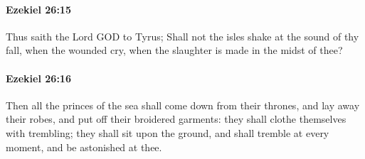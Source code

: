 		\paragraph{Ezekiel 26:15} %
			\label{EZEKIEL-26-15}

			Thus saith the Lord GOD to Tyrus; Shall not the isles shake at the sound of thy fall, when the wounded cry, when the slaughter is made in the midst of thee?


		\paragraph{Ezekiel 26:16} %
			\label{EZEKIEL-26-16}

			Then all the princes of the sea shall come down from their thrones, and lay away their robes, and put off their broidered garments: they shall clothe themselves with trembling; they shall sit upon the ground, and shall tremble at every moment, and be astonished at thee.

